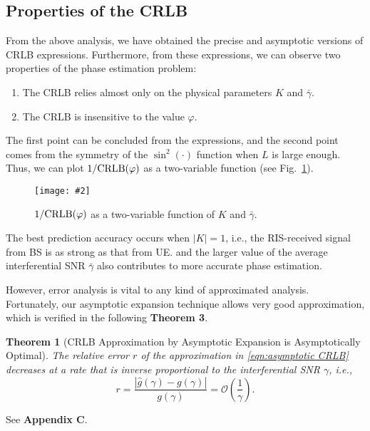 \documentclass[12pt,draftclsnofoot,journal,onecolumn]{IEEEtran}
\newtheorem{theorem}{\bf Theorem}
\theoremstyle{nonumberplain}
\newcommand{\myincludegraphics}[2][width=12cm]{\texttt{[image: \#2]}}
\begin{document}
\subsection{Properties of the CRLB}
    From the above analysis, we have obtained the precise and asymptotic versions of CRLB expressions. Furthermore, from these expressions, we can observe two properties of the phase estimation problem:
    \begin{enumerate}
        \item The CRLB relies almost only on the physical parameters $K$ and $\bar{\gamma}$.
        \item The CRLB is insensitive to the value $\varphi$.
    \end{enumerate}
    The first point can be concluded from the expressions, and the second point comes from the symmetry of the $\sin^2(\cdot)$ function when $L$ is large enough. Thus, we can plot $1/{\rm CRLB}(\varphi)$ as a two-variable function (see Fig.~\ref{fig:CRLB two variable}). 
    \begin{figure}[!h]
        \centering
        \myincludegraphics{figures/crlb.pdf}
        \caption{$1/{\rm CRLB}(\varphi)$ as a two-variable function of $K$ and $\bar{\gamma}$.}
        \label{fig:CRLB two variable}
    \end{figure}
    The best prediction accuracy occurs when $\lvert K \rvert = 1$, i.e., the RIS-received signal from BS is as strong as that from UE. and the larger value of the average interferential SNR $\bar{\gamma}$ also contributes to more accurate phase estimation. 

    However, error analysis is vital to any kind of approximated analysis. Fortunately, our asymptotic expansion technique allows very good approximation, which is verified in the following {\bf Theorem 3}. 

    \begin{theorem}[CRLB Approximation by Asymptotic Expansion is Asymptotically Optimal]
        The relative error $r$ of the approximation in \eqref{eqn:asymptotic CRLB} decreases at a rate that is inverse proportional to the interferential SNR $\gamma$, i.e.,
        \begin{equation}
            r=\frac{\left|\hat{g}(\gamma)-g(\gamma)\right|}{g(\gamma)} = \mathcal{O}\left(\frac{1}{\gamma}\right).
        \end{equation}
    \end{theorem}
    \begin{IEEEproof}
        See {\bf Appendix C}. 
    \end{IEEEproof}
\end{document}
